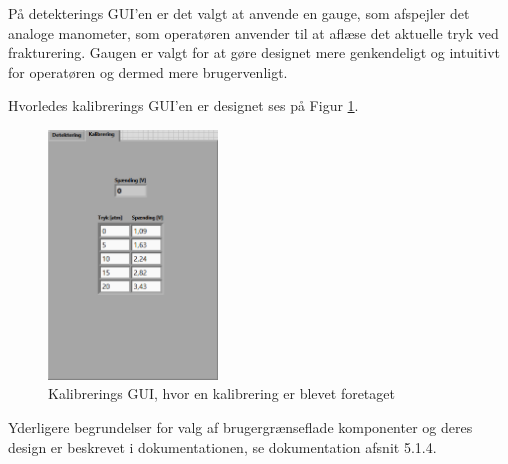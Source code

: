 På detekterings GUI'en er det valgt at anvende en gauge, som afspejler det analoge manometer, som operatøren anvender til at aflæse det aktuelle tryk ved frakturering. Gaugen er valgt for at gøre designet mere genkendeligt og intuitivt for operatøren og dermed mere brugervenligt. 

Hvorledes kalibrerings GUI'en er designet ses på Figur \ref{kali}. 

\begin{figure}[H]
	\centering
	\includegraphics[width=0.4\textwidth]{Figure/kalibreringsGUI}
	\caption{Kalibrerings GUI, hvor en kalibrering er blevet foretaget}
    \label{kali}
\end{figure}

Yderligere begrundelser for valg af brugergrænseflade komponenter og deres design er beskrevet i dokumentationen, se dokumentation afsnit 5.1.4.  
  


























